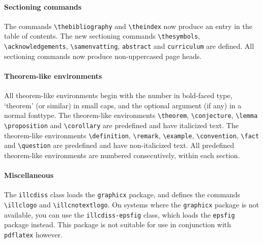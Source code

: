 \paragraph*{Sectioning commands}
The commands \verb|\thebibliography| and \verb|\theindex| now
produce an entry in the table of contents.
The new sectioning commands \verb|\thesymbols|, \verb|\acknowledgements|,
\verb|\samenvatting|, \verb|abstract| and \verb|curriculum| are defined.
All sectioning commands now produce non-uppercased page heads.

\paragraph*{Theorem-like environments}
All theorem-like environments begin with the number in bold-faced type,
`theorem' (or similar) in small caps,
and the optional argument (if any) in a normal fonttype.
The theorem-like environments
\verb|\theorem|,
\verb|\conjecture|,
\verb|\lemma|
\verb|\proposition| and
\verb|\corollary|
are predefined and have italicized text.
The theorem-like environments
\verb|\definition|,
\verb|\remark|,
\verb|\example|,
\verb|\convention|,
\verb|\fact| and
\verb|\question|
are predefined and have non-italicized text.
All predefined theorem-like environments are numbered consecutively,
within each section.

\paragraph*{Miscellaneous}
The \verb|illcdiss| class loads the \verb|graphicx| package,
and defines the commands 
\verb|\illclogo| and \verb|\illcnotextlogo|.
On systems where the \verb|graphicx| package is not available, you
can use the \verb|illcdiss-epsfig| class, which loads the
\verb|epsfig| package instead. This package is not suitable for
use in conjunction with \verb|pdflatex| however.

